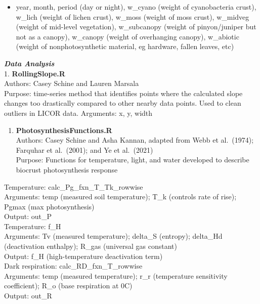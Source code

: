\documentclass[
]{article}
\providecommand{\tightlist}{%
  \setlength{\itemsep}{0pt}\setlength{\parskip}{0pt}}
\begin{document}
\begin{itemize}
\tightlist
\item
  year, month, period (day or night), w\_cyano (weight of cyanobacteria
  crust), w\_lich (weight of lichen crust), w\_moss (weight of moss
  crust), w\_midveg (weight of mid-level vegetation), w\_subcanopy
  (weight of pinyon/juniper but not as a canopy), w\_canopy (weight of
  overhanging canopy), w\_abiotic (weight of nonphotosynthetic material,
  eg hardware, fallen leaves, etc)\\
\end{itemize}

\textbf{\emph{Data Analysis}}\\
1. \textbf{RollingSlope.R}\\
Authors: Casey Schine and Lauren Marsala\\
Purpose: time-series method that identifies points where the calculated
slope changes too drastically compared to other nearby data points. Used
to clean outliers in LICOR data. Arguments: x, y, width\\

\begin{enumerate}
\def\labelenumi{\arabic{enumi}.}
\setcounter{enumi}{1}
\tightlist
\item
  \textbf{PhotosynthesisFunctions.R}\\
  Authors: Casey Schine and Asha Kannan, adapted from Webb et
  al.~(1974); Farquhar et al.~(2001); and Ye et al.~(2021)\\
  Purpose: Functions for temperature, light, and water developed to
  describe biocrust photosynthesis response\\
\end{enumerate}

Temperature: calc\_Pg\_fxn\_T\_Tk\_rowwise\\
Arguments: temp (measured soil temperature); T\_k (controls rate of
rise); Pgmax (max photosynthesis)\\
Output: out\_P\\
Temperature: f\_H\\
Arguments: Tv (measured temperature); delta\_S (entropy); delta\_Hd
(deactivation enthalpy); R\_gas (universal gas constant)\\
Output: f\_H (high-temperature deactivation term)\\
Dark respiration: calc\_RD\_fxn\_T\_rowwise\\
Arguments: temp (measured temperature); r\_r (temperature sensitivity
coefficient); R\_o (base respiration at 0C)\\
Output: out\_R\\
\end{document}
